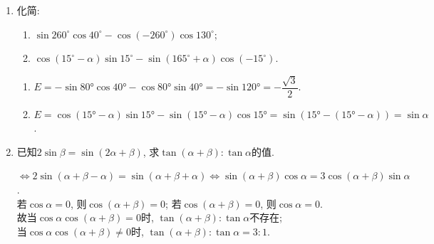 \begin{enumerate}
\item 化简: 
\begin{enumerate}[(1)]
\item $\sin260^\circ\cos40^\circ-\cos(-260^\circ)\cos130^\circ$;
\item $\cos(15^\circ-\alpha)\sin15^\circ-\sin(165^\circ+\alpha)\cos(-15^\circ)$. 
\end{enumerate}
\begin{jieda}
\begin{enumerate}[(1)]
\item $E=-\sin\ang{80}\cos\ang{40}-\cos\ang{80}\sin\ang{40}=-\sin\ang{120}=-\dfrac{\sqrt{3}}{2}$. 
\item $E=\cos(\ang{15}-\alpha)\sin\ang{15}-\sin(\ang{15}-\alpha)\cos\ang{15}=\sin(\ang{15}-(\ang{15}-\alpha))=\sin\alpha$. 
\end{enumerate}
\end{jieda}

\item 已知$2\sin\beta=\sin(2\alpha+\beta)$, 求$\tan(\alpha+\beta):\tan\alpha$的值. 
\begin{jieda}
$\iff 2\sin(\alpha+\beta-\alpha)=\sin(\alpha+\beta+\alpha)\iff\sin(\alpha+\beta)\cos\alpha=3\cos(\alpha+\beta)\sin\alpha$. \\
若$\cos\alpha=0$, 则$\cos(\alpha+\beta)=0$; 若$\cos(\alpha+\beta)=0$, 则$\cos\alpha=0$. \\
故当$\cos\alpha\cos(\alpha+\beta)=0$时, $\tan(\alpha+\beta):\tan\alpha$不存在; \\
当$\cos\alpha\cos(\alpha+\beta)\neq 0$时, $\tan(\alpha+\beta):\tan\alpha=3:1$. 
\end{jieda}



\end{enumerate}
